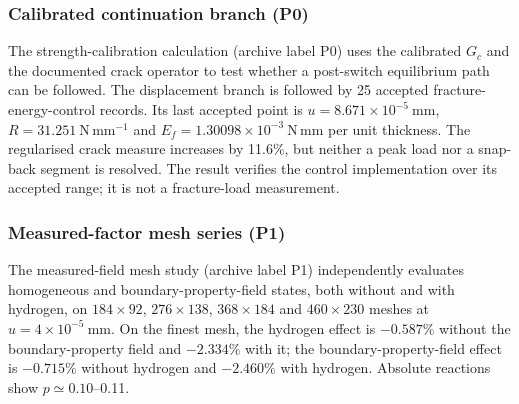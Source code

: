 \documentclass[preprint,12pt]{elsarticle}
\begin{document}
\subsubsection*{Calibrated continuation branch (P0)}
The strength-calibration calculation (archive label P0) uses the calibrated $G_c$ and the documented crack operator to test whether a
post-switch equilibrium path can be followed. The displacement branch is followed
by 25 accepted fracture-energy-control records. Its last accepted point is
$u=8.671\times10^{-5}~\mathrm{mm}$,
$R=31.251~\mathrm{N\,mm^{-1}}$ and
$E_f=1.30098\times10^{-3}~\mathrm{N\,mm}$ per unit thickness. The regularised
crack measure increases by 11.6\%, but neither a peak load nor a snap-back segment
is resolved. The result verifies the control implementation over its accepted
range; it is not a fracture-load measurement.

\subsubsection*{Measured-factor mesh series (P1)}
The measured-field mesh study (archive label P1) independently evaluates homogeneous and boundary-property-field states, both without and with hydrogen, on $184\times92$, $276\times138$, $368\times184$ and $460\times230$
meshes at $u=4\times10^{-5}~\mathrm{mm}$. On the finest mesh, the hydrogen effect
is $-0.587\%$ without the boundary-property field and $-2.334\%$ with it; the boundary-property-field effect is
$-0.715\%$ without hydrogen and $-2.460\%$ with hydrogen. Absolute reactions show
$p\simeq0.10$--0.11.
\end{document}
